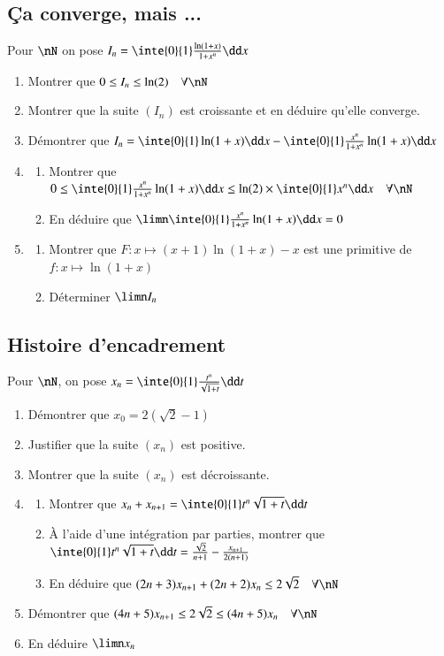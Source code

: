 \documentclass[oneside,12pt]{article}          %
\begin{document}
\subsection{Ça converge, mais ...}
Pour $\nN$ on pose $I_n=\inte{0}{1}\frac{\ln(1+x)}{1+x^n}\dd x$
\begin{enumerate}
    \item Montrer que $0\leq I_n \leq \ln(2)\quad\forall\nN$
    \item Montrer que la suite $(I_n)$ est croissante et en déduire qu'elle converge.
    \item Démontrer que $I_n=\inte{0}{1}\ln(1+x)\dd x - \inte{0}{1}\frac{x^n}{1+x^n}\ln(1+x)\dd x$
    \item \begin{enumerate}
        \item Montrer que $0\leq \inte{0}{1}\frac{x^n}{1+x^n}\ln(1+x)\dd x \leq \ln(2)\times\inte{0}{1}x^n\dd x \quad \forall\nN$
        \item En déduire que $\limn \inte{0}{1}\frac{x^n}{1+x^n}\ln(1+x)\dd x=0$
    \end{enumerate}
    \item \begin{enumerate}
        \item Montrer que $F:x\mapsto (x+1)\ln(1+x)-x$ est une primitive de $f:x\mapsto\ln(1+x)$
        \item Déterminer $\limn I_n$
    \end{enumerate}
\end{enumerate}



\subsection{Histoire d'encadrement}
Pour $\nN$, on pose $x_n=\inte{0}{1}\frac{t^n}{\sqrt{1+t}}\dd t$
\begin{enumerate}
    \item Démontrer que $x_0=2(\sqrt{2}-1)$
    \item Justifier que la suite $(x_n)$ est positive.
    \item Montrer que la suite $(x_n)$ est décroissante.
    \item \begin{enumerate}
        \item Montrer que $x_n+x_{n+1}=\inte{0}{1}t^n\sqrt{1+t}\dd t$
        \item À l'aide d'une intégration par parties, montrer que $\inte{0}{1}t^n\sqrt{1+t}\dd t=\frac{\sqrt{2}}{n+1}-\frac{x_{n+1}}{2(n+1)}$
        \item En déduire que $(2n+3)x_{n+1}+(2n+2)x_n\leq 2\sqrt{2}\quad\forall\nN$
    \end{enumerate}
    \item Démontrer que $(4n+5)x_{n+1}\leq2\sqrt{2}\leq(4n+5)x_n\quad\forall\nN$
    \item En déduire $\limn x_n$
\end{enumerate}
\end{document}
